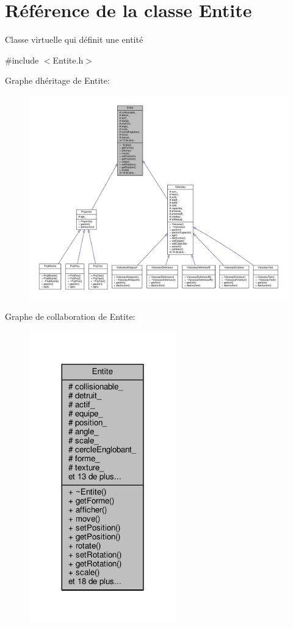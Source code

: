 \hypertarget{class_entite}{}\section{Référence de la classe Entite}
\label{class_entite}


Classe virtuelle qui définit une entité  




{\ttfamily \#include $<$Entite.\+h$>$}



Graphe d\textquotesingle{}héritage de Entite\+:\nopagebreak
\begin{figure}[H]
\begin{center}
\leavevmode
\includegraphics[width=350pt]{class_entite__inherit__graph}
\end{center}
\end{figure}


Graphe de collaboration de Entite\+:\nopagebreak
\begin{figure}[H]
\begin{center}
\leavevmode
\includegraphics[width=180pt]{class_entite__coll__graph}
\end{center}
\end{figure}
